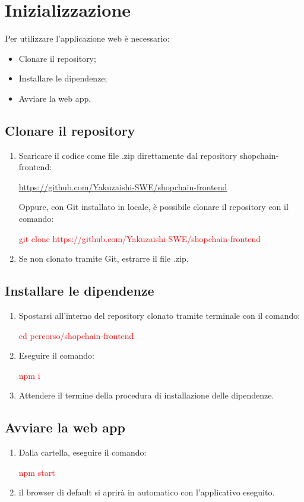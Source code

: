 \section{Inizializzazione}\label{section:inizializzazione}

Per utilizzare l'applicazione web è necessario:
\begin{itemize}
    \item Clonare il repository;
    \item Installare le dipendenze;
    \item Avviare la web app.
\end{itemize}


\subsection{Clonare il repository}

\begin{enumerate}
    \item Scaricare il codice come file .zip direttamente dal repository shopchain-frontend:
            \begin{center}
                \href{https://github.com/Yakuzaishi-SWE/shopchain-frontend}{https://github.com/Yakuzaishi-SWE/shopchain-frontend}
            \end{center}
            Oppure, con Git\glo{} installato in locale, è possibile clonare il repository con il comando:
            \begin{center}
                \textcolor{red}{git clone https://github.com/Yakuzaishi-SWE/shopchain-frontend}
            \end{center}
    \item Se non clonato tramite Git, estrarre il file .zip.
\end{enumerate}

\subsection{Installare le dipendenze}

\begin{enumerate}
    \item Spostarsi all'interno del repository clonato tramite terminale con il comando:
    \begin{center}
        \textcolor{red}{cd percorso/shopchain-frontend}
    \end{center}
    \item Eseguire il comando:
    \begin{center}
        \textcolor{red}{npm i}
    \end{center}
    \item Attendere il termine della procedura di installazione delle dipendenze.
\end{enumerate}

\subsection{Avviare la web app}

\begin{enumerate}
    \item Dalla cartella, eseguire il comando:
    \begin{center}
        \textcolor{red}{npm start}
    \end{center}
    \item il browser di default si aprirà in automatico con l'applicativo eseguito.
\end{enumerate}